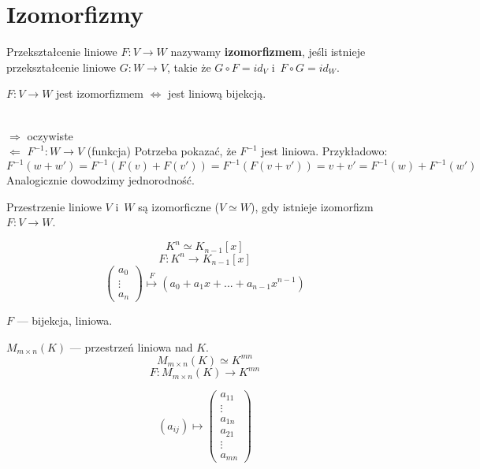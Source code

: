 \section{Izomorfizmy}
\begin{df}
    Przekształcenie liniowe $F: V \rightarrow W$ nazywamy
    \textbf{izomorfizmem}, jeśli istnieje przekształcenie
    liniowe $G: W\rightarrow V$, takie że $G\circ F = id_V$
    i~$F\circ G=id_W$.
\end{df}

\begin{ft}
    $F: V \rightarrow W$ jest izomorfizmem $\Leftrightarrow$ jest liniową
  bijekcją.
\end{ft}

\begin{dd} ~\\
    $\Rightarrow$ oczywiste\\
  $\Leftarrow$ $F^{-1}: W \rightarrow V$ (funkcja)
  Potrzeba pokazać, że $F^{-1}$ jest liniowa. Przykładowo:
  $$F^{-1}(w+w')=F^{-1}(F(v)+F(v'))=F^{-1}(F(v+v'))=v+v'=F^{-1}(w)+F^{-1}(w')$$ 
  Analogicznie dowodzimy jednorodność.
\end{dd}

\begin{df}
    Przestrzenie liniowe $V$ i~$W$ są izomorficzne ($V \simeq W$), gdy istnieje
    izomorfizm $F: V \rightarrow W$.
\end{df}

\begin{przy}
    \[K^n \simeq K_{n-1}[x]\]
    \[F: K^n \rightarrow K_{n-1}[x]\]
    \[\begin{pmatrix}a_0\\ \vdots \\a_n\end{pmatrix} \overset{F}{\longmapsto}
    \left(a_0+a_1x+...+a_{n-1}x^{n-1}\right)\]
    
    $F$ --- bijekcja, liniowa.
    
    \vspace{5mm}
    $M_{m\times n}(K)$ --- przestrzeń liniowa nad $K$.
  \[M_{m\times n}(K) \simeq K^{mn}\]
  \[F: M_{m\times n}(K) \rightarrow K^{mn}\]

  \[(a_{ij}) \longmapsto \begin{pmatrix}a_{11}\\ \vdots\\a_{1n}\\
    a_{21}\\ \vdots \\a_{mn}\end{pmatrix}\]
\end{przy}

